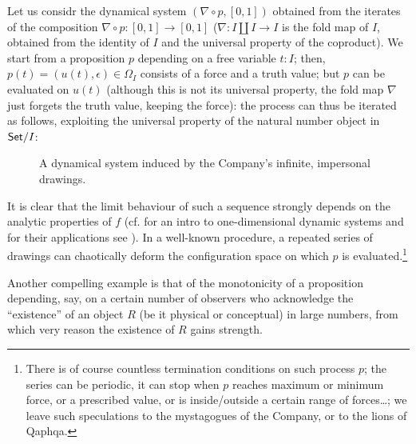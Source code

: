 \begin{example}
	Let us considr the dynamical system $(\nabla\circ p, [0,1])$ obtained from the iterates of the composition $\nabla \circ p : [0,1] \to [0,1]$ ($\nabla : I\amalg I \to I$ is the fold map of $I$, obtained from the identity of $I$ and the universal property of the coproduct). We start from a proposition $p$ depending on a free variable $t : I$; then, $p(t) = (u(t),\epsilon)\in \Omega_I$ consists of a force and a truth value; but $p$ can be evaluated on $u(t)$ (although this is not its universal property, the fold map $\nabla$ just forgets the truth value, keeping the force): the process can thus be iterated as follows, exploiting the universal property of the natural number object in $\mathsf{Set}/I$:
	\begin{center}
		\begin{figure}[h]
			\def\line{\draw (0,0) -- (1,0); \draw (0,.5) -- (1,.5);}
			\caption{A dynamical system induced by the Company's infinite, impersonal drawings.}
			\label{fig_dynamics}
		\end{figure}
	\end{center}
	It is clear that the limit behaviour of such a sequence strongly depends on the analytic properties of $f$ (cf. \cite{strogatz1996nonlinear} for an intro to one-dimensional dynamic systems and for their applications see \cite{wiggins2003introduction}). In a well-known procedure, a repeated series of drawings can chaotically deform the configuration space on which $p$ is evaluated.\footnote{There is of course countless termination conditions on such process $p$; the series can be periodic, it can stop when $p$ reaches maximum or minimum force, or a prescribed value, or is inside/outside a certain range of forces\dots; we leave such speculations to the mystagogues of the Company, or to the lions of Qaphqa.}
\end{example}
Another compelling example is that of the monotonicity of a proposition depending, say, on a certain number of observers who acknowledge the ``existence'' of an object $R$ (be it physical or conceptual) in large numbers, from which very reason the existence of $R$ gains strength.
